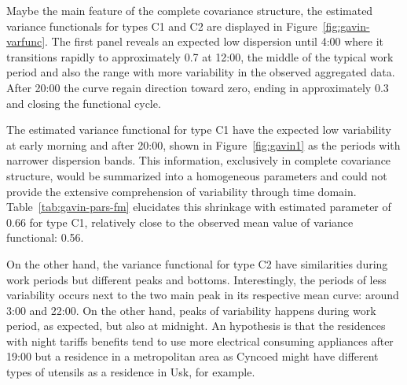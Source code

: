 Maybe the main feature of the complete covariance structure, the estimated variance functionals for types C1 and C2 are displayed in Figure~\ref{fig:gavin-varfunc}. The first panel reveals an expected low dispersion until 4:00 where it transitions rapidly to approximately 0.7 at 12:00, the middle of the typical work period and also the range with more variability in the observed aggregated data. After 20:00 the curve regain direction toward zero, ending in approximately 0.3 and closing the functional cycle.%


The estimated variance functional for type C1 have the expected low variability at early morning and after 20:00, shown in Figure~\ref{fig:gavin1} as the periods with narrower dispersion bands. This information, exclusively in complete covariance structure, would be summarized into a homogeneous parameters and could not provide the extensive comprehension of variability through time domain. Table~\ref{tab:gavin-pars-fm} elucidates this shrinkage with estimated parameter of 0.66 for type C1, relatively close to the observed mean value of variance functional: 0.56.

On the other hand, the variance functional for type C2 have similarities during work periods but different peaks and bottoms. Interestingly, the periods of less variability occurs next to the two main peak in its respective mean curve: around 3:00 and 22:00. On the other hand, peaks of variability happens during work period, as expected, but also at midnight. An hypothesis is that the residences with night tariffs benefits tend to use more electrical consuming appliances after 19:00 but a residence in a metropolitan area as Cyncoed might have different types of utensils as a residence in Usk, for example.

